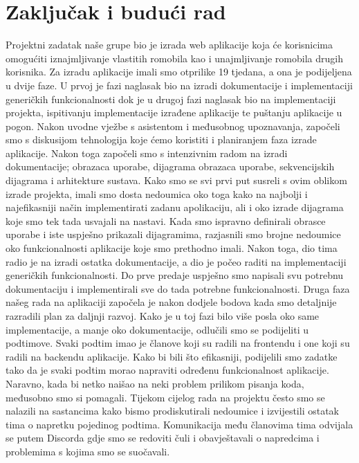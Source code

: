 \chapter{Zaključak i budući rad}
		
		
		Projektni zadatak naše grupe bio je izrada web aplikacije koja će korisnicima omogućiti iznajmljivanje vlastitih romobila kao i unajmljivanje romobila drugih korisnika. \newline
		Za izradu aplikacije imali smo otprilike 19 tjedana, a ona je podijeljena u dvije faze.
		U prvoj je fazi naglasak bio na izradi dokumentacije i implementaciji generičkih funkcionalnosti dok je u drugoj fazi naglasak bio na implementaciji projekta, ispitivanju implementacije izrađene aplikacije te puštanju aplikacije u pogon.
		Nakon uvodne vježbe s asistentom i međusobnog upoznavanja, započeli smo s diskusijom tehnologija koje ćemo koristiti i planiranjem faza izrade aplikacije. Nakon toga započeli smo s intenzivnim radom na izradi dokumentacije; obrazaca uporabe, dijagrama obrazaca uporabe, sekvencijskih dijagrama i arhitekture sustava.
		Kako smo se svi prvi put susreli s ovim oblikom izrade projekta, imali smo dosta nedoumica oko toga kako na najbolji i najefikasniji način implementirati zadanu apolikaciju, ali i oko izrade dijagrama koje smo tek tada usvajali na nastavi. Kada smo ispravno definirali obrasce uporabe i iste uspješno prikazali dijagramima, razjasnili smo brojne nedoumice oko funkcionalnosti aplikacije koje smo prethodno imali. Nakon toga, dio tima radio je na izradi ostatka dokumentacije, a dio je počeo raditi na implementaciji generičkih funkcionalnosti. Do prve predaje uspješno smo napisali svu potrebnu dokumentaciju i implementirali sve do tada potrebne funkcionalnosti. \newline
		Druga faza našeg rada na aplikaciji započela je nakon dodjele bodova kada smo detaljnije razradili plan za daljnji razvoj. Kako je u toj fazi bilo više posla oko same implementacije, a manje oko dokumentacije, odlučili smo se podijeliti u podtimove. Svaki podtim imao je članove koji su radili na frontendu i one koji su radili na backendu aplikacije. Kako bi bili što efikasniji, podijelili smo zadatke tako da je svaki podtim morao napraviti određenu funkcionalnost aplikacije. Naravno, kada bi netko naišao na neki problem prilikom pisanja koda, međusobno smo si pomagali. Tijekom cijelog rada na projektu često smo se nalazili na sastancima kako bismo prodiskutirali nedoumice i izvijestili ostatak tima o napretku pojedinog podtima. Komunikacija među članovima tima odvijala se putem Discorda gdje smo se redoviti čuli i obavještavali o napredcima i problemima s kojima smo se suočavali. \newline  
